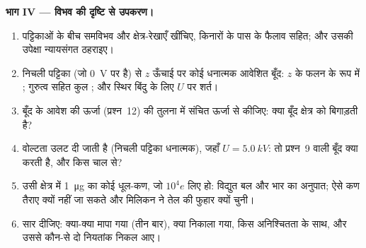 \begin{problem}
\medskip
\noindent\textbf{भाग IV --- विभव की दृष्टि से उपकरण।}
\begin{enumerate}[resume]
  \item पट्टिकाओं के बीच समविभव और क्षेत्र-रेखाएँ खींचिए, किनारों के पास
        के फैलाव सहित; और उसकी उपेक्षा न्यायसंगत ठहराइए।
  \item निचली पट्टिका (जो \qty{0}{V} पर है) से $z$ ऊँचाई पर कोई धनात्मक
        आवेशित बूँद: $z$ के फलन के रूप में ; गुरुत्व सहित कुल
        ; और स्थिर बिंदु के लिए $U$ पर शर्त।
  \item बूँद के आवेश की ऊर्जा (प्रश्न~12) की तुलना  में संचित
        ऊर्जा से कीजिए: क्या बूँद क्षेत्र को बिगाड़ती है?
  \item वोल्टता उलट दी जाती है (निचली पट्टिका धनात्मक), जहाँ
        $U = \qty{5.0}{kV}$: तो प्रश्न~9 वाली बूँद क्या करती है, और किस
        चाल से?
  \item उसी क्षेत्र में \qty{1}{\micro g} का कोई धूल-कण, जो $10^4e$ लिए हो:
        विद्युत बल और भार का अनुपात; ऐसे कण तैराए क्यों नहीं जा सकते और
        मिलिकन ने तेल की फुहार क्यों चुनी।
  \item सार दीजिए: क्या-क्या मापा गया (तीन बार), क्या निकाला गया, किस
        अनिश्चितता के साथ, और उससे कौन-से दो नियतांक निकल आए।
\end{enumerate}
\end{problem}
